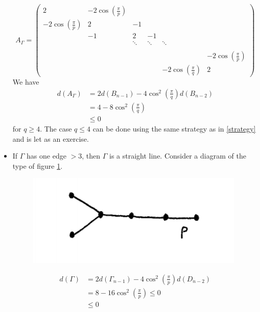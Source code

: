 \begin{itemize}
\begin{equation}
A_\Gamma = \begin{pmatrix}
2 &-2 \cos \left(\frac{\pi}{p}\right) & & & &\\
-2 \cos \left(\frac{\pi}{p}\right) &2 &-1  & & &\\
 &-1 &2 &-1 & &\\
 & &\ddots &\ddots &\ddots & \\
 & & & & & \\
 & & & & &-2\cos\left(\frac{\pi}{p} \right) \\
 & & & &-2 \cos\left(\frac{\pi}{q} \right) &2
\end{pmatrix}
\end{equation} We have
\begin{equation}
\begin{split}
d(A_\Gamma ) &= 2 d(B_{n-1} ) - 4 \cos^2 \left( \frac{\pi}{q} \right) d(B_{n-2} ) \\
&= 4 - 8 \cos^2 \left( \frac{\pi}{q} \right) \\
&\le 0
\end{split}
\end{equation} for $q \ge 4$. The case $q\le 4$ can be done using the same strategy as in \eqref{strategy} and is let as an exercise.

\item If $\Gamma$ has one edge $> 3$, then $\Gamma$ is a straight line. Consider a diagram of the type of figure \ref{cours9fig5}.

\begin{figure}[h!]
\centering
\includegraphics[scale=0.6]{cours9fig5.png}
\caption{}
\label{cours9fig5}
\end{figure}

\begin{equation}
\begin{split}
d(\Gamma ) &= 2 d(\Gamma_{n-1}) - 4 \cos^2 \left( \frac{\pi}{p} \right) d (D_{n-2}) \\
&= 8 - 16 \cos^2 \left( \frac{\pi}{p} \right) \le 0 \\
&\le 0
\end{split}
\end{equation}


\end{itemize}

